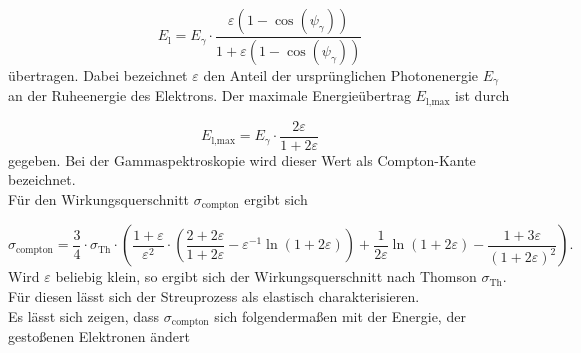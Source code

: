 \begin{equation}
  \label{eqn:comptonuebertrag}
  E_\text{l} = E_{\gamma} \cdot \frac{\varepsilon \left( 1 - \cos\left( \psi_{\gamma} \right) \right)}{1
  + \varepsilon \left( 1 - \cos\left( \psi_{\gamma} \right) \right)}
\end{equation}
übertragen. Dabei bezeichnet $\varepsilon$ den Anteil der ursprünglichen
Photonenergie $E_{\gamma}$ an der Ruheenergie des Elektrons. Der maximale Energieübertrag $E_\text{l,max}$ ist durch

\begin{equation}
  \label{eqn:ckante}
  E_\text{l,max} = E_\gamma \cdot \frac{2\varepsilon}{1 + 2\varepsilon}
\end{equation}
gegeben. Bei der Gammaspektroskopie wird dieser Wert als Compton-Kante bezeichnet.\\
Für den Wirkungsquerschnitt $\sigma_\text{compton}$ ergibt sich

\begin{equation}
  \label{eqn:comptonquerschnitt}
  \sigma_\text{compton} = \frac{3}{4} \cdot \sigma_\text{Th}
  \cdot \left( \frac{1 + \varepsilon}{\varepsilon^2}
  \cdot \left( \frac{2 + 2\varepsilon}{1 + 2\varepsilon} - \varepsilon^{-1} \ln\left( 1 + 2\varepsilon \right) \right)
  + \frac{1}{2\varepsilon} \ln\left( 1 + 2\varepsilon \right) - \frac{1 + 3\varepsilon}{(1 + 2\varepsilon)^2}  \right) .
\end{equation}
Wird $\varepsilon$ beliebig klein, so ergibt sich der Wirkungsquerschnitt nach Thomson
$\sigma_\text{Th}$. Für diesen lässt sich der Streuprozess als elastisch charakterisieren.\\
Es lässt sich zeigen, dass $\sigma_\text{compton}$ sich folgendermaßen mit der Energie, der gestoßenen Elektronen ändert


